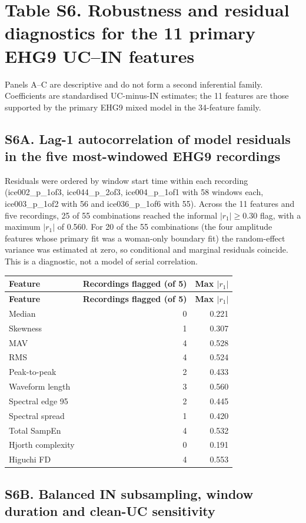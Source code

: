 \documentclass[10pt]{article}
\begin{document}
\section*{Table S6. Robustness and residual diagnostics for the 11 primary EHG9 UC--IN features}\label{tab:s6_robustness}
Panels A--C are descriptive and do not form a second inferential family. Coefficients are standardised UC-minus-IN estimates; the 11 features are those supported by the primary EHG9 mixed model in the 34-feature family.
\subsection*{S6A. Lag-1 autocorrelation of model residuals in the five most-windowed EHG9 recordings}
Residuals were ordered by window start time within each recording (ice002\_p\_1of3, ice044\_p\_2of3, ice004\_p\_1of1 with 58 windows each, ice003\_p\_1of2 with 56 and ice036\_p\_1of6 with 55). Across the 11 features and five recordings, 25 of 55 combinations reached the informal $|r_1|\ge0.30$ flag, with a maximum $|r_1|$ of 0.560. For 20 of the 55 combinations (the four amplitude features whose primary fit was a woman-only boundary fit) the random-effect variance was estimated at zero, so conditional and marginal residuals coincide. This is a diagnostic, not a model of serial correlation.
\begin{longtable}{p{4.2cm}rr}
\toprule
\textbf{Feature} & \textbf{Recordings flagged (of 5)} & \textbf{Max $|r_1|$} \\
\midrule
\endfirsthead
\toprule
\textbf{Feature} & \textbf{Recordings flagged (of 5)} & \textbf{Max $|r_1|$} \\
\midrule
\endhead
Median & 0 & 0.221 \\
Skewness & 1 & 0.307 \\
MAV & 4 & 0.528 \\
RMS & 4 & 0.524 \\
Peak-to-peak & 2 & 0.433 \\
Waveform length & 3 & 0.560 \\
Spectral edge 95 & 2 & 0.445 \\
Spectral spread & 1 & 0.420 \\
Total SampEn & 4 & 0.532 \\
Hjorth complexity & 0 & 0.191 \\
Higuchi FD & 4 & 0.553 \\
\bottomrule
\end{longtable}
\subsection*{S6B. Balanced IN subsampling, window duration and clean-UC sensitivity}
\end{document}
